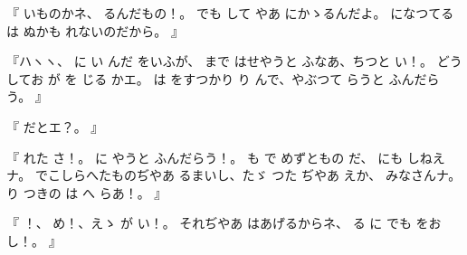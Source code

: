 『
いものかネ、
るんだもの！。
でも
して
やあ
にかゝるんだよ。
になつてる
は
ぬかも
れないのだから。
』

『ハヽヽ、
に
い
んだ
をいふが、
まで
はせやうと
ふなあ、ちつと
い！。
どうしてお
が
を
じる
かエ。
は
をすつかり
り
んで、やぶつて
らうと
ふんだらう。
』

『
だとエ？。
』

『
れた
さ！。
に
やうと
ふんだらう！。
も
で
めずともの
だ、
にも
しねえナ。
でこしらへたものぢやあ
るまいし、たゞ
つた
ぢやあ
えか、
みなさんナ。
り
つきの
は
へ
らあ！。
』

『
！、
め！、えゝ
が
い！。
それぢやあ
はあげるからネ、
る
に
でも
をお
し！。
』

